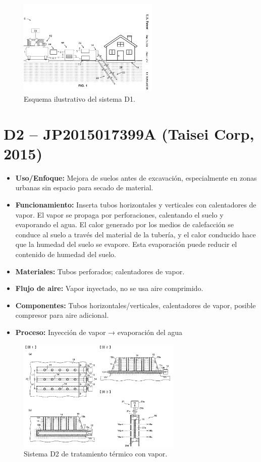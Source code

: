 \documentclass[12pt]{article}
\begin{document}
\begin{figure}[H]
\centering
\includegraphics[width=0.6\textwidth]{images/d1_williams.png}
\caption{Esquema ilustrativo del sistema D1.}
\end{figure}

\section*{ D2 – JP2015017399A (Taisei Corp, 2015)}

\begin{itemize}
    \item \textbf{Uso/Enfoque:} Mejora de suelos antes de excavación, especialmente en zonas urbanas sin espacio para secado de material.
    \item \textbf{Funcionamiento:} Inserta tubos horizontales y verticales con calentadores de vapor. El vapor se propaga por perforaciones, calentando el suelo y evaporando el agua. El calor generado por los medios de calefacción se conduce al suelo a través del material de la tubería, y el calor conducido hace que la humedad del suelo se evapore. Esta evaporación puede reducir el contenido de humedad del suelo.
    \item \textbf{Materiales:} Tubos perforados; calentadores de vapor.
    \item \textbf{Flujo de aire:} Vapor inyectado, no se usa aire comprimido.
    \item \textbf{Componentes:} Tubos horizontales/verticales, calentadores de vapor, posible compresor para aire adicional.
    \item \textbf{Proceso:} Inyección de vapor → evaporación del agua
\end{itemize}

\begin{figure}[H]
\centering
\includegraphics[width=0.7\textwidth]{images/d2_taisei.png}
\caption{Sistema D2 de tratamiento térmico con vapor.}
\end{figure}
\end{document}
